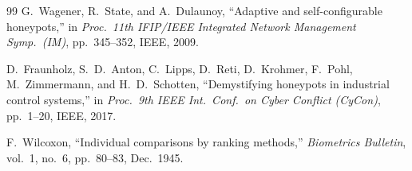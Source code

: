\documentclass[journal]{IEEEtran}
\begin{document}
\begin{thebibliography}{99}
G.~Wagener, R.~State, and A.~Dulaunoy,
``Adaptive and self-configurable honeypots,''
in \emph{Proc.\ 11th IFIP/IEEE Integrated Network Management
Symp.\ (IM)}, pp.~345--352, IEEE, 2009.

D.~Fraunholz, S.~D.~Anton, C.~Lipps, D.~Reti, D.~Krohmer,
F.~Pohl, M.~Zimmermann, and H.~D.~Schotten,
``Demystifying honeypots in industrial control systems,''
in \emph{Proc.\ 9th IEEE Int.\ Conf.\ on Cyber Conflict (CyCon)},
pp.~1--20, IEEE, 2017.

F.~Wilcoxon,
``Individual comparisons by ranking methods,''
\emph{Biometrics Bulletin}, vol.~1, no.~6,
pp.~80--83, Dec.\ 1945.

\end{thebibliography}
\end{document}
